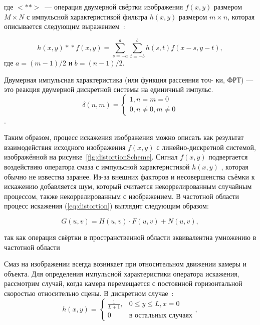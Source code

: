 где $<*\!*>$~--- операция двумерной свёртки изображения $f(x,y)$ размером $M\times N$ с импульсной характеристикой фильтра $h(x,y)$ размером $m\times n$, которая описывается следующим выражением~\cite[стр.~298]{gonsalesDigital2012}:

\begin{equation}
h(x,y) *\!* f(x,y) = \sum_{s=-a}^{a}\sum_{t=-b}^{b}h(s,t)f(x-s, y-t),
\end{equation}
где $a=(m-1)/2$ и $b = (n-1)/2$.

\begin{definition}
Двумерная импульсная характеристика (или функция рассеяния точ-
ки, ФРТ) — это реакция двумерной дискретной системы на единичный импульс.
$$\delta(n,m) = 
	\begin{cases}
		1, n=m=0\\
		0, n\ne 0, m\ne 0
	\end{cases}$$.
\end{definition}

Таким образом, процесс искажения изображения можно описать как результат взаимодействия исходного изображения $f(x, y)$ с линейно-дискретной системой, изображённой на рисунке~\ref{fig:distortionScheme}. Сигнал $f(x, y)$ подвергается воздействию оператора смаза с импульсной характеристикой $h(x, y)$ , которая обычно не известна заранее. Из-за внешних факторов и несовершенства съёмки к искажению добавляется шум, который считается некоррелированным случайным процессом, также некоррелированным с изображением.
В частотной области процесс искажения (\ref{eq:distortion}) выглядит следующим образом:

\begin{equation}\label{eq:distortionFourier}
G(u,v) = H(u,v)\cdot F(u,v) + N(u,v),
\end{equation}

так как операция свёртки в пространственной области эквивалентна умножению в частотной области\cite[стр.~39]{basicsOfDigitalDataProcessing2016Umnyashkin}

Смаз на изображении всегда возникает при относительном движении камеры и объекта. Для определения импульсной характеристики оператора искажения, рассмотрим случай, когда камера перемещается с постоянной горизонтальной скоростью относительно сцены. В дискретном случае~\cite{iterableImageRestorationBiemonLangddeik}:
\begin{equation}\label{eq:horizontalBlurPsf}
	h(x,y) = 
		\begin{cases}
			\frac{1}{L+1}, & 0 \leq y \leq L, x=0\\
			0              & \text{в остальных случаях}
		\end{cases},
\end{equation}

